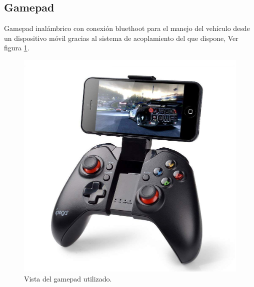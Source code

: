 \subsection{Gamepad}

Gamepad inalámbrico con conexión bluethoot para el manejo del vehículo desde un dispositivo móvil gracias al sistema de acoplamiento del que dispone, Ver figura \ref{figura:control_pad}.

\begin{figure}[H]
  \begin{center}
    \includegraphics[scale=0.2]{imagenes/robot/control_pad.jpg}
  \end{center}
  \caption{Vista del gamepad utilizado.}
  \label{figura:control_pad}
\end{figure}